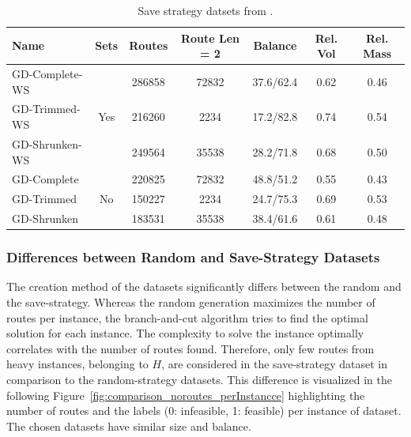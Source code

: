 \begin{table}[!ht]
	\centering
	\small
	\begin{tabular}{l c c c c c c }
		\toprule
		Name           & Sets                 & Routes & Route Len = 2 & Balance   & Rel. Vol & Rel. Mass \\
		\midrule
		GD-Complete-WS & \multirow{3}{*}{Yes} & 286858 & 72832         & 37.6/62.4 & 0.62     & 0.46      \\
		GD-Trimmed-WS  &                      & 216260 & 2234          & 17.2/82.8 & 0.74     & 0.54      \\
		GD-Shrunken-WS &                      & 249564 & 35538         & 28.2/71.8 & 0.68     & 0.50      \\        \midrule
		GD-Complete    & \multirow{3}{*}{No}  & 220825 & 72832         & 48.8/51.2 & 0.55     & 0.43      \\
		GD-Trimmed     &                      & 150227 & 2234          & 24.7/75.3 & 0.69     & 0.53      \\
		GD-Shrunken    &                      & 183531 & 35538         & 38.4/61.6 & 0.61     & 0.48      \\
		\bottomrule
	\end{tabular}
	\caption[Save-strategy train datsets from \gendreauDataSet.]{Save strategy datsets from \gendreauDataSet.}
	\label{tab:saved_instances_gendreau}
\end{table}

\subsubsection{Differences between Random and Save-Strategy Datasets}

The creation method of the datasets significantly differs between the random and the save-strategy. Whereas the random
generation maximizes the number of routes per instance, the branch-and-cut algorithm tries to
find the optimal solution for each instance. The complexity to solve the instance optimally correlates with the number of routes found.
Therefore, only few routes from heavy instances, belonging to $H$, are considered in the save-strategy dataset
in comparison to the random-strategy datasets. This difference is visualized in the following Figure~\ref{fig:comparison_noroutes_perInstancce}
highlighting the number of routes and the labels (0: infeasible, 1: feasible) per instance of \gendreauDataSet dataset. The chosen
datasets have similar size and balance.

